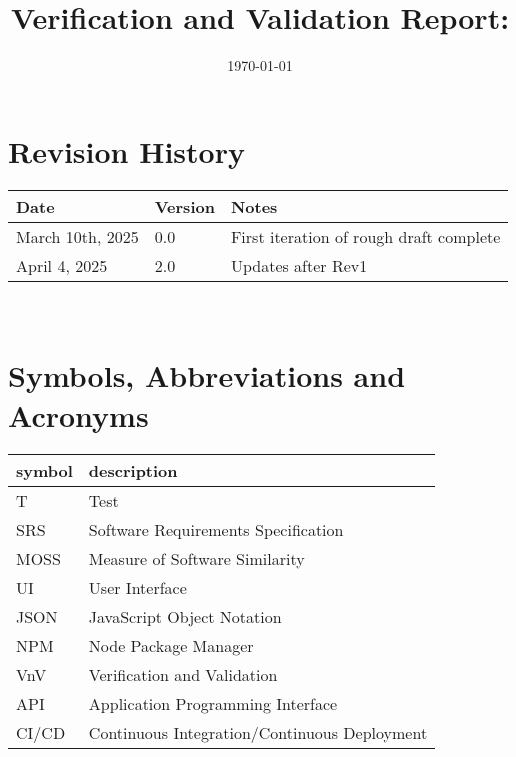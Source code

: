 \documentclass[12pt, titlepage]{article}
\begin{document}
\title{Verification and Validation Report: \progname} 
\author{\authname}
\date{\today}
	
\maketitle


\section{Revision History}

\begin{tabularx}{\textwidth}{p{3cm}p{2cm}X}
\toprule {\bf Date} & {\bf Version} & {\bf Notes}\\
\midrule
March 10th, 2025 & 0.0 & First iteration of rough draft complete\\
April 4, 2025 & 2.0 & Updates after Rev1\\
\bottomrule
\end{tabularx}

~\newpage

\section{Symbols, Abbreviations and Acronyms}

\renewcommand{\arraystretch}{1.2}
\begin{tabular}{l l} 
  \toprule		
  \textbf{symbol} & \textbf{description}\\
  \midrule 
  T & Test\\
  SRS & Software Requirements Specification \\
  MOSS & Measure of Software Similarity \\
  UI & User Interface \\
  JSON & JavaScript Object Notation \\
  NPM & Node Package Manager \\
  VnV & Verification and Validation \\
  API & Application Programming Interface \\
  CI/CD & Continuous Integration/Continuous Deployment\\
  \bottomrule
\end{tabular}\\

\newpage

\tableofcontents

\listoftables %
\end{document}
